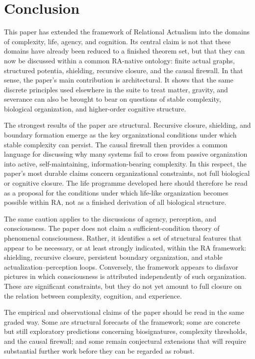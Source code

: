 \documentclass[11pt]{article}
\begin{document}
\section{Conclusion}
\label{sec:conclusion}

This paper has extended the framework of Relational Actualism into the domains of complexity, life, agency, and cognition. Its central claim is not that these domains have already been reduced to a finished theorem set, but that they can now be discussed within a common RA-native ontology: finite actual graphs, structured potentia, shielding, recursive closure, and the causal firewall. In that sense, the paper's main contribution is architectural. It shows that the same discrete principles used elsewhere in the suite to treat matter, gravity, and severance can also be brought to bear on questions of stable complexity, biological organization, and higher-order cognitive structure.

The strongest results of the paper are structural. Recursive closure, shielding, and boundary formation emerge as the key organizational conditions under which stable complexity can persist. The causal firewall then provides a common language for discussing why many systems fail to cross from passive organization into active, self-maintaining, information-bearing complexity. In this respect, the paper's most durable claims concern organizational constraints, not full biological or cognitive closure. The life programme developed here should therefore be read as a proposal for the conditions under which life-like organization becomes possible within RA, not as a finished derivation of all biological structure.

The same caution applies to the discussions of agency, perception, and consciousness. The paper does not claim a sufficient-condition theory of phenomenal consciousness. Rather, it identifies a set of structural features that appear to be necessary, or at least strongly indicated, within the RA framework: shielding, recursive closure, persistent boundary organization, and stable actualization--perception loops. Conversely, the framework appears to disfavor pictures in which consciousness is attributed independently of such organization. These are significant constraints, but they do not yet amount to full closure on the relation between complexity, cognition, and experience.

The empirical and observational claims of the paper should be read in the same graded way. Some are structural forecasts of the framework; some are concrete but still exploratory predictions concerning biosignatures, complexity thresholds, and the causal firewall; and some remain conjectural extensions that will require substantial further work before they can be regarded as robust.
\end{document}

